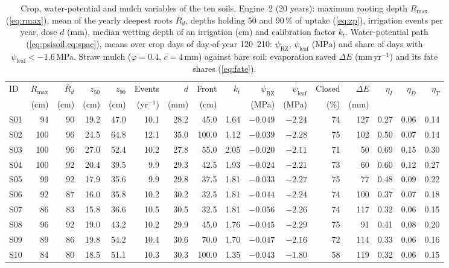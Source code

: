 \begin{table}[H]\centering\small
\caption{Crop, water-potential and mulch variables of the ten soils. Engine~2 (20 years): maximum rooting depth $R_{\max}$ (\cref{eq:rmax}), mean of the yearly deepest roots $\bar R_d$, depths holding 50 and 90\,\% of uptake (\cref{eq:zp}), irrigation events per year, dose $d$ (mm), median wetting depth of an irrigation (cm) and calibration factor $k_t$. Water-potential path (\cref{eq:psisoil,eq:spac}), means over crop days of day-of-year 120--210: $\psi_{\mathrm{RZ}}$, $\psi_{\mathrm{leaf}}$ (MPa) and share of days with $\psi_{\mathrm{leaf}}<-1.6$\,MPa. Straw mulch ($\varphi=0.4$, $c=4$\,mm) against bare soil: evaporation saved $\Delta E$ (mm\,yr$^{-1}$) and its fate shares (\cref{eq:fate}).}
\label{tab:swa-plant}
\setlength{\tabcolsep}{2.2pt}\footnotesize
\begin{tabular}{lrrrrrrrrrrrrrrr}
\toprule
ID & $R_{\max}$ & $\bar R_d$ & $z_{50}$ & $z_{90}$ & Events & $d$ & Front & $k_t$ & $\psi_{\mathrm{RZ}}$ & $\psi_{\mathrm{leaf}}$ & Closed & $\Delta E$ & $\eta_I$ & $\eta_D$ & $\eta_T$\\
 & (cm) & (cm) & (cm) & (cm) & (yr$^{-1}$) & (mm) & (cm) & & (MPa) & (MPa) & (\%) & (mm) & & & \\\midrule
S01 & 94 & 90 & 19.2 & 47.0 & 10.1 & 28.2 & 45.0 & 1.64 & $-0.049$ & $-2.24$ & 74 & 127 & 0.27 & 0.06 & 0.14\\
S02 & 100 & 96 & 24.5 & 64.8 & 12.1 & 35.0 & 100.0 & 1.12 & $-0.039$ & $-2.28$ & 75 & 102 & 0.50 & 0.07 & 0.14\\
S03 & 100 & 96 & 27.0 & 52.4 & 10.2 & 27.8 & 55.0 & 2.05 & $-0.020$ & $-2.11$ & 71 & 50 & 0.69 & 0.15 & 0.30\\
S04 & 100 & 92 & 20.4 & 39.5 & 9.9 & 29.3 & 42.5 & 1.93 & $-0.024$ & $-2.21$ & 73 & 60 & 0.60 & 0.12 & 0.27\\
S05 & 99 & 92 & 17.9 & 35.6 & 9.9 & 29.8 & 37.5 & 1.81 & $-0.033$ & $-2.27$ & 75 & 77 & 0.48 & 0.09 & 0.22\\
S06 & 92 & 87 & 16.0 & 35.8 & 10.2 & 30.2 & 32.5 & 1.81 & $-0.044$ & $-2.24$ & 74 & 100 & 0.37 & 0.07 & 0.18\\
S07 & 86 & 83 & 15.8 & 36.6 & 10.5 & 30.5 & 32.5 & 1.81 & $-0.056$ & $-2.26$ & 74 & 117 & 0.32 & 0.06 & 0.15\\
S08 & 96 & 92 & 19.0 & 43.2 & 10.2 & 29.9 & 45.0 & 1.76 & $-0.045$ & $-2.29$ & 75 & 91 & 0.41 & 0.08 & 0.20\\
S09 & 89 & 86 & 19.8 & 54.2 & 10.4 & 30.6 & 70.0 & 1.70 & $-0.047$ & $-2.16$ & 72 & 114 & 0.33 & 0.06 & 0.16\\
S10 & 84 & 80 & 18.5 & 51.1 & 10.3 & 30.3 & 100.0 & 1.35 & $-0.043$ & $-1.80$ & 58 & 119 & 0.32 & 0.06 & 0.15\\\bottomrule
\end{tabular}
\end{table}

